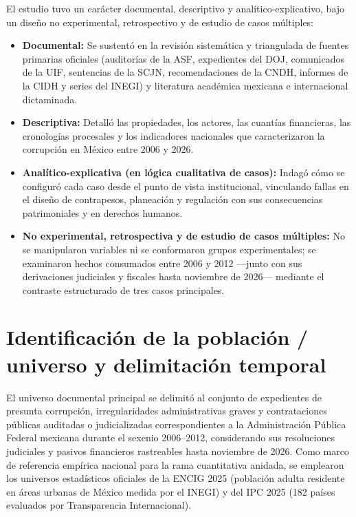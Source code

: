 El estudio tuvo un carácter documental, descriptivo y analítico-explicativo, bajo un diseño no experimental, retrospectivo y de estudio de casos múltiples:

\begin{itemize}
  \item \textbf{Documental:} Se sustentó en la revisión sistemática y triangulada de fuentes primarias oficiales (auditorías de la ASF, expedientes del DOJ, comunicados de la UIF, sentencias de la SCJN, recomendaciones de la CNDH, informes de la CIDH y series del INEGI) y literatura académica mexicana e internacional dictaminada.
  
  \item \textbf{Descriptiva:} Detalló las propiedades, los actores, las cuantías financieras, las cronologías procesales y los indicadores nacionales que caracterizaron la corrupción en México entre 2006 y 2026.
  
  \item \textbf{Analítico-explicativa (en lógica cualitativa de casos):} Indagó cómo se configuró cada caso desde el punto de vista institucional, vinculando fallas en el diseño de contrapesos, planeación y regulación con sus consecuencias patrimoniales y en derechos humanos.
  
  \item \textbf{No experimental, retrospectiva y de estudio de casos múltiples:} No se manipularon variables ni se conformaron grupos experimentales; se examinaron hechos consumados entre 2006 y 2012 ---junto con sus derivaciones judiciales y fiscales hasta noviembre de 2026--- mediante el contraste estructurado de tres casos principales.
\end{itemize}

\section{Identificación de la población / universo y delimitación temporal}

El universo documental principal se delimitó al conjunto de expedientes de presunta corrupción, irregularidades administrativas graves y contrataciones públicas auditadas o judicializadas correspondientes a la Administración Pública Federal mexicana durante el sexenio 2006--2012, considerando sus resoluciones judiciales y pasivos financieros rastreables hasta noviembre de 2026. Como marco de referencia empírica nacional para la rama cuantitativa anidada, se emplearon los universos estadísticos oficiales de la ENCIG 2025 (población adulta residente en áreas urbanas de México medida por el INEGI) y del IPC 2025 (182 países evaluados por Transparencia Internacional).

